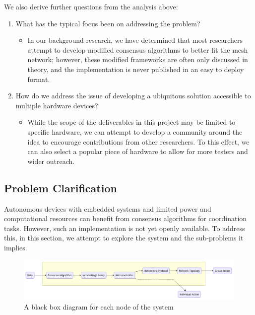 We also derive further questions from the analysis above:

\begin{enumerate}

    \item What has the typical focus been on addressing the problem?
    \begin{itemize}
        \item In our background research, we have determined that most researchers attempt to develop modified consensus algorithms to better fit the mesh network; however, these modified frameworks are often only discussed in theory, and the implementation is never published in an easy to deploy format.
    \end{itemize}
    
    \item How do we address the issue of developing a ubiquitous solution accessible to multiple hardware devices?
    \begin{itemize}
        \item While the scope of the deliverables in this project may be limited to specific hardware, we can attempt to develop a community around the idea to encourage contributions from other researchers. To this effect, we can also select a popular piece of hardware to allow for more testers and wider outreach.
    \end{itemize}
\end{enumerate}



\subsection{Problem Clarification}

Autonomous devices with embedded systems and limited power and computational resources can benefit from consensus algorithms for coordination tasks. However, such an implementation is not yet openly available. To address this, in this section, we attempt to explore the system and the sub-problems it implies.

\begin{figure}[H]
    \centering
    \includegraphics[width=0.90\columnwidth]{images/blackbox.png}
    \caption{A black box diagram for each node of the system}
    \label{fig:black_box}

\end{figure}

